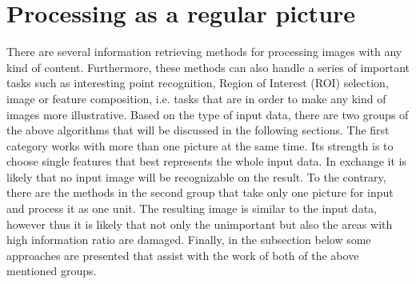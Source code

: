 \documentclass[draft,final]{vutinfth} %
\begin{document}
	\section{Processing as a regular picture}
	There are several information retrieving methods for processing images with any kind of content.
	Furthermore, these methods can also handle a series of important tasks such as interesting point recognition, Region of Interest (ROI) selection, image or feature composition, i.e. tasks that are in order to make any kind of images more illustrative.
	Based on the type of input data, there are two groups of the above algorithms that will be discussed in the following sections.
	The first category works with more than one picture at the same time.
	Its strength is to choose single features that best represents the whole input data. 
	In exchange it is likely that no input image will be recognizable on the result.
	To the contrary, there are the methods in the second group that take only one picture for input and process it as one unit.
	The resulting image is similar to the input data, however thus it is likely that not only the unimportant but also the areas with high information ratio are damaged.
	Finally, in the subsection below some approaches are presented that assist with the work of both of the above mentioned groups.
	
\end{document}
